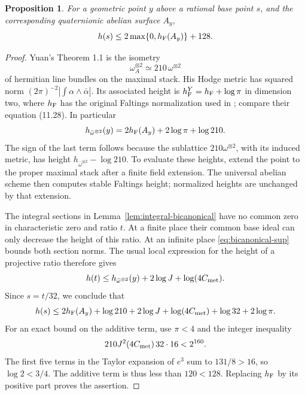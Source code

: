 \documentclass[11pt]{article}
\newtheorem{proposition}[theorem]{Proposition}
\theoremstyle{definition}
\begin{document}
\begin{proposition}\label{prop:numerical-geometric-height}
For a geometric point \(y\) above a rational base point \(s\),
and the corresponding quaternionic abelian surface \(A_y\),
\[
                 h(s)\le2\max\{0,h_{\rm F}(A_y)\}+128.
\]

\end{proposition}
\begin{proof}
Yuan's Theorem 1.1 is the isometry
\[
  \omega_{A}^{\otimes2}\simeq210\,\omega^{\otimes2}
\]
of hermitian line bundles on the maximal stack. His Hodge metric
has squared norm \((2\pi)^{-2}|\int\alpha\wedge\bar\alpha|\).
Its associated height is
\(h_{\rm F}^{Y}=h_{\rm F}+\log\pi\) in dimension two, where
\(h_{\rm F}\) has the original Faltings normalization used in
\cite{vonKaenelKret}; compare their equation (11.28).
In particular
\[
              h_{\bar\omega^{\otimes2}}(y)
                  =2h_{\rm F}(A_y)+2\log\pi+\log210.
\]
The sign of the last term follows because the sublattice
\(210\omega^{\otimes2}\), with its induced metric, has height
\(h_{\bar\omega^{\otimes2}}-\log210\).
To evaluate these heights, extend the point to the proper maximal
stack after a finite field extension. The universal abelian scheme
then computes stable Faltings height; normalized heights are unchanged
by that extension.

The integral sections in Lemma~\ref{lem:integral-bicanonical}
have no common zero in characteristic zero and ratio \(t\).
At a finite place their common base ideal can only decrease the
height of this ratio. At an infinite place
\eqref{eq:bicanonical-sup} bounds both section norms. The usual
local expression for the height of a projective ratio therefore gives
\[
 h(t)\le h_{\bar\omega^{\otimes2}}(y)
                         +2\log J+\log(4C_{\rm met}).
\]
Since \(s=t/32\), we conclude that
\[
 h(s)\le2h_{\rm F}(A_y)
       +\log210+2\log J+\log(4C_{\rm met})+\log32+2\log\pi.
\]
For an exact bound on the additive term, use \(\pi<4\) and
the integer inequality
\[
             210J^2(4C_{\rm met})\,32\cdot16<2^{160}.
\]
The first five terms in the Taylor expansion of \(e^3\) sum to
\(131/8>16\), so \(\log2<3/4\). The additive term is thus
less than \(120<128\). Replacing \(h_{\rm F}\) by its positive
part proves the assertion.
\end{proof}
\end{document}
